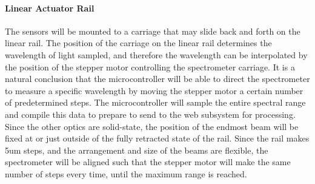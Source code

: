 \documentclass[journal]{IEEEtran}
\begin{document}
\paragraph{Linear Actuator Rail} The sensors will be mounted to a carriage that may slide back and forth on the linear rail. The position of the carriage on the linear rail determines the wavelength of light sampled, and therefore the wavelength can be interpolated by the position of the stepper motor controlling the spectrometer carriage. It is a natural conclusion that the microcontroller will be able to direct the spectrometer to measure a specific wavelength by moving the stepper motor a certain number of predetermined steps. The microcontroller will sample the entire spectral range and compile this data to prepare to send to the web subsystem for processing. Since the other optics are solid-state, the position of the endmost beam will be fixed at or just outside of the fully retracted state of the rail. Since the rail makes 5um steps, and the arrangement and size of the beams are flexible, the spectrometer will be aligned such that the stepper motor will make the same number of steps every time, until the maximum range is reached. \break
\end{document}
